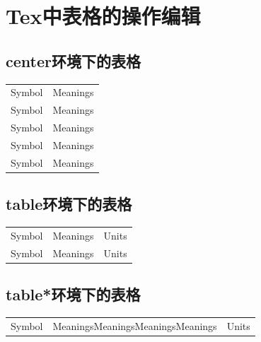 \documentclass[normalsize]{article}   %
\begin{document}
	\section{Tex中表格的操作编辑}
	
	\subsection{center环境下的表格}
	
		\begin{center}
			\begin{tabular}{cr}
				\hline
				\makebox[0.45\textwidth][l]{符号}	& \makebox[0.45\textwidth][r]{意义}   \\ \hline
				Symbol  & Meanings \\ 
				Symbol  & Meanings \\ \hline
				Symbol  & Meanings \\ 
				Symbol  & Meanings \\ 
				Symbol  & Meanings \\ \hline
			\end{tabular}
		\end{center}
	
	
	\subsection{table环境下的表格}
		\begin{table}[htbp!]
			\centering
			\begin{tabular}{crc}
				\hline
				\makebox[0.25\textwidth][c]{符号}	& \makebox[0.35\textwidth][c]{意义} & \makebox[0.2\textwidth][c]{单位}	 \\ \hline
				Symbol  & Meanings & Units\\ 
				Symbol  & Meanings & Units\\ \hline
			\end{tabular}
		\end{table}
		\subsection{table*环境下的表格}
			\begin{table}[htbp!]
				\centering
				\begin{tabular}{ccc}
					\hline
					\makebox[0.25\textwidth][c]{符号}	& \makebox[0.35\textwidth][c]{意义} & \makebox[0.2\textwidth][c]{单位}	 \\ \hline
					Symbol  & MeaningsMeaningsMeaningsMeanings & Units\\
					\hline
				\end{tabular}%
				\label{tab:addlabel}%
			\end{table}%
\end{document}
